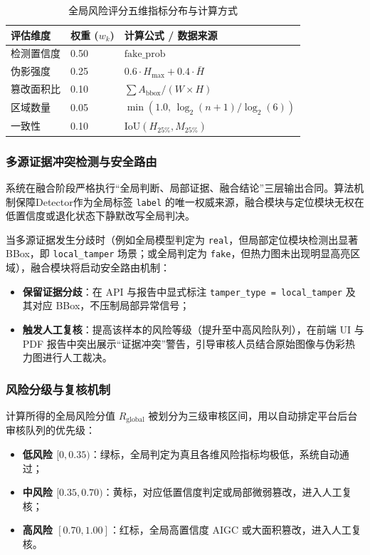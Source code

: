 \documentclass[UTF8, a4paper, 12pt]{ctexart}
\begin{document}
\begin{table}[htbp]
\centering
\caption{全局风险评分五维指标分布与计算方式}
\label{tab:risk_scoring_dimensions}
\begin{tabular}{lll}
\toprule
\textbf{评估维度} & \textbf{权重 ($w_k$)} & \textbf{计算公式 / 数据来源} \\
\midrule
检测置信度 & 0.50 & $\text{fake\_prob}$ \\
伪影强度 & 0.25 & $0.6 \cdot H_{\max} + 0.4 \cdot \bar{H}$ \\
篡改面积比 & 0.10 & $\sum A_{\text{bbox}} / (W \times H)$ \\
区域数量 & 0.05 & $\min\left(1.0, \, \log_2(n+1) / \log_2(6)\right)$ \\
一致性 & 0.10 & $\text{IoU}\left(H_{25\%}, M_{25\%}\right)$ \\
\bottomrule
\end{tabular}
\end{table}

\subsubsection{多源证据冲突检测与安全路由}

系统在融合阶段严格执行“全局判断、局部证据、融合结论”三层输出合同。算法机制保障Detector作为全局标签 \texttt{label} 的唯一权威来源，融合模块与定位模块无权在低置信度或退化状态下静默改写全局判决。

当多源证据发生分歧时（例如全局模型判定为 \texttt{real}，但局部定位模块检测出显著 BBox，即 \texttt{local\_tamper} 场景；或全局判定为 \texttt{fake}，但热力图未出现明显高亮区域），融合模块将启动安全路由机制：
\begin{itemize}
 \item \textbf{保留证据分歧}：在 API 与报告中显式标注 \texttt{tamper\_type = local\_tamper} 及其对应 BBox，不压制局部异常信号；
 \item \textbf{触发人工复核}：提高该样本的风险等级（提升至中高风险队列），在前端 UI 与 PDF 报告中突出展示“证据冲突”警告，引导审核人员结合原始图像与伪彩热力图进行人工裁决。
\end{itemize}

\subsubsection{风险分级与复核机制}

计算所得的全局风险分值 $R_{\text{global}}$ 被划分为三级审核区间，用以自动排定平台后台审核队列的优先级：
\begin{itemize}
 \item \textbf{低风险 $[0, 0.35)$}：绿标，全局判定为真且各维风险指标均极低，系统自动通过；
 \item \textbf{中风险 $[0.35, 0.70)$}：黄标，对应低置信度判定或局部微弱篡改，进入人工复核；
 \item \textbf{高风险 $[0.70, 1.00]$}：红标，全局高置信度 AIGC 或大面积篡改，进入人工复核。
\end{itemize}
\end{document}

